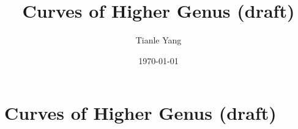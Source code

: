 \documentclass{noteformyself}
\title{Curves of Higher Genus (draft)}
\author{Tianle Yang}
\date{\today}
\begin{document}
    \maketitle

    \section{Curves of Higher Genus (draft)}



\end{document}
